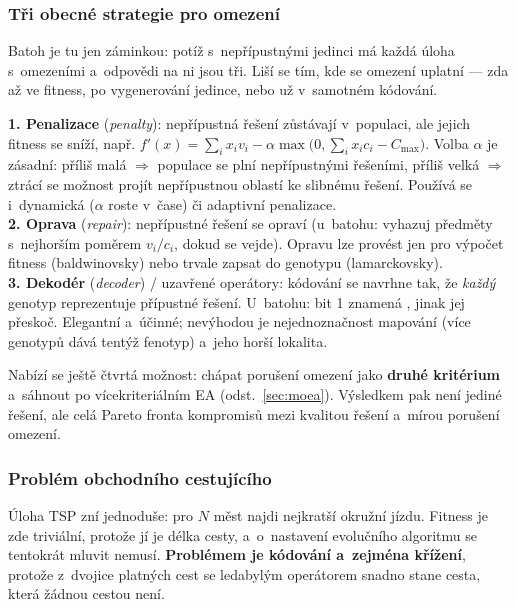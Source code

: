 \documentclass[11pt,a4paper]{article}
\theoremstyle{definition}
\begin{document}
\subsubsection{Tři obecné strategie pro omezení}

Batoh je tu jen záminkou: potíž s~nepřípustnými jedinci má každá úloha s~omezeními a~odpovědi
na ni jsou tři. Liší se tím, kde se omezení uplatní --- zda až ve fitness, po vygenerování
jedince, nebo už v~samotném kódování.

\begin{defbox}
\textbf{1. Penalizace} (\emph{penalty}): nepřípustná řešení zůstávají
v~populaci, ale jejich fitness se sníží, např.
$f'(x) = \sum_i x_i v_i - \alpha \max\big(0, \sum_i x_i c_i - C_{\max}\big)$.
Volba $\alpha$ je zásadní: příliš malá $\Rightarrow$ populace se plní
nepřípustnými řešeními, příliš velká $\Rightarrow$ ztrácí se možnost projít
nepřípustnou oblastí ke slibnému řešení. Používá se i~dynamická
($\alpha$ roste v~čase) či adaptivní penalizace.\\
\textbf{2. Oprava} (\emph{repair}): nepřípustné řešení se opraví
(u~batohu: vyhazuj předměty s~nejhorším poměrem $v_i/c_i$, dokud se vejde).
Opravu lze provést jen pro výpočet fitness (baldwinovsky) nebo trvale
zapsat do genotypu (lamarckovsky).\\
\textbf{3. Dekodér} (\emph{decoder}) / uzavřené operátory: kódování se navrhne
tak, že \emph{každý} genotyp reprezentuje přípustné řešení. U~batohu: bit
1 znamená , jinak jej přeskoč.
Elegantní a~účinné; nevýhodou je ne\-jed\-no\-znač\-nost mapování (více
genotypů dává tentýž fenotyp) a~jeho horší lokalita.
\end{defbox}

Nabízí se ještě čtvrtá možnost: chápat porušení omezení jako \textbf{druhé kritérium}
a~sáhnout po vícekriteriálním EA (odst.~\ref{sec:moea}). Výsledkem pak není jediné řešení,
ale celá Pareto fronta kompromisů mezi kvalitou řešení a~mírou porušení omezení.

\subsubsection{Problém obchodního cestujícího}

Úloha TSP zní jednoduše: pro $N$ měst najdi nejkratší okružní jízdu. Fitness je zde
triviální, protože jí je délka cesty, a~o~nastavení evolučního algoritmu se tentokrát mluvit
nemusí. \textbf{Problémem je kódování a~zejména křížení}, protože z~dvojice platných cest se
ledabylým operátorem snadno stane cesta, která žádnou cestou není.
\end{document}
